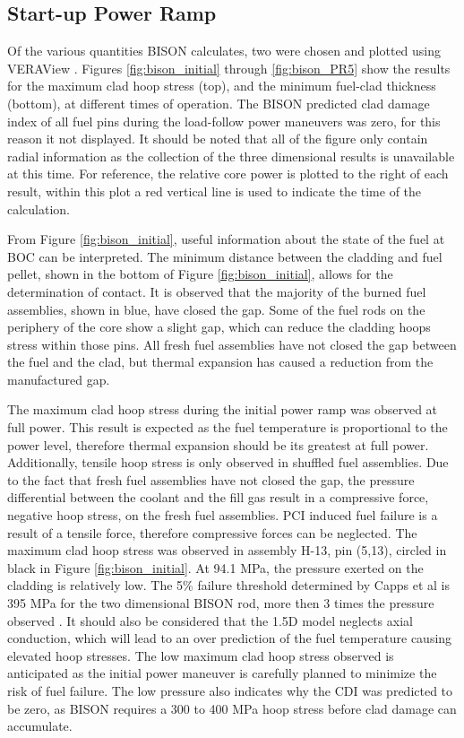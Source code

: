 \documentclass[edeposit,fullpage,11pt]{uiucthesis2009}
\begin{document}
\subsection{Start-up Power Ramp}

Of the various quantities BISON calculates, two were chosen and plotted using VERAView \cite{lee_veraview_2016}.
Figures \ref{fig:bison_initial} through \ref{fig:bison_PR5} show the results for the maximum clad hoop stress (top), and the minimum fuel-clad thickness (bottom), at different times of operation. 
The BISON predicted clad damage index of all fuel pins during the load-follow power maneuvers was zero, for this reason it not displayed.
It should be noted that all of the figure only contain radial information as the collection of the three dimensional results is unavailable at this time. 
For reference, the relative core power is plotted to the right of each result, within this plot a red vertical line is used to indicate the time of the calculation.

From Figure \ref{fig:bison_initial}, useful information about the state of the fuel at \gls{BOC}  can be interpreted. 
The minimum distance between the cladding and fuel pellet, shown in the bottom of Figure \ref{fig:bison_initial}, allows for the determination of contact. 
It is observed that the majority of the burned fuel assemblies, shown in blue, have closed the gap. 
Some of the fuel rods on the periphery of the core show a slight gap, which can reduce the cladding hoops stress within those pins.
All fresh fuel assemblies have not closed the gap between the fuel and the clad, but thermal expansion has caused a reduction from the manufactured gap.

The maximum clad hoop stress during the initial power ramp was observed at full power.
This result is expected as the fuel temperature is proportional to the power level, therefore thermal expansion should be its greatest at full power.
Additionally, tensile hoop stress is only observed in shuffled fuel assemblies.
Due to the fact that fresh fuel assemblies have not closed the gap, the pressure differential between the coolant and the fill gas result in a compressive force, negative hoop stress, on the fresh fuel assemblies.
\gls{PCI} induced fuel failure is a result of a tensile force, therefore compressive forces can be neglected.
The maximum clad hoop stress was observed in assembly H-13, pin (5,13), circled in black in Figure \ref{fig:bison_initial}. 
At 94.1 MPa, the pressure exerted on the cladding is relatively low. 
The 5\% failure threshold determined by Capps et al is 395 MPa for the two dimensional BISON rod, more then 3 times the pressure observed \cite{capps_pci_2017}.
It should also be considered that the 1.5D model neglects axial conduction, which will lead to an over prediction of the fuel temperature causing elevated hoop stresses.
The low maximum clad hoop stress observed is anticipated as the initial power maneuver is carefully planned to minimize the risk of fuel failure.
The low pressure also indicates why the CDI was predicted to be zero, as BISON requires a 300 to 400 MPa hoop stress before clad damage can accumulate.
\end{document}
